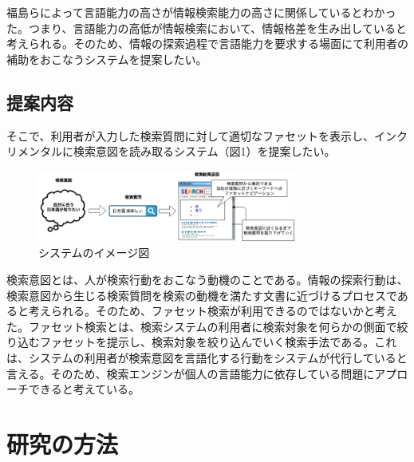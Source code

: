 \documentclass[a4j,10pt, twocolumn]{jarticle} \usepackage[dvipdfmx]{graphicx} \usepackage{amssymb} \usepackage{amsmath}
\begin{document}
 福島らによって言語能力の高さが情報検索能力の高さに関係しているとわかった\cite{fukushima}。つまり、言語能力の高低が情報検索において、情報格差を生み出していると考えられる。そのため、情報の探索過程で言語能力を要求する場面にて利用者の補助をおこなうシステムを提案したい。
\subsection{提案内容}

 そこで、利用者が入力した検索質問に対して適切なファセットを表示し、インクリメンタルに検索意図を読み取るシステム（図1）を提案したい。

 \begin{figure}[ht]
   \includegraphics[width=85mm]{./new_ir_with_navi.png}
   \caption{システムのイメージ図}
 \end{figure}
 
 検索意図とは、人が検索行動をおこなう動機のことである。情報の探索行動は、検索意図から生じる検索質問を検索の動機を満たす文書に近づけるプロセスであると考えられる。そのため、ファセット検索が利用できるのではないかと考えた。ファセット検索とは、検索システムの利用者に検索対象を何らかの側面で絞り込むファセットを提示し、検索対象を絞り込んでいく検索手法である\cite{faceted}。これは、システムの利用者が検索意図を言語化する行動をシステムが代行していると言える。そのため、検索エンジンが個人の言語能力に依存している問題にアプローチできると考えている。
\section{研究の方法}
\end{document}
